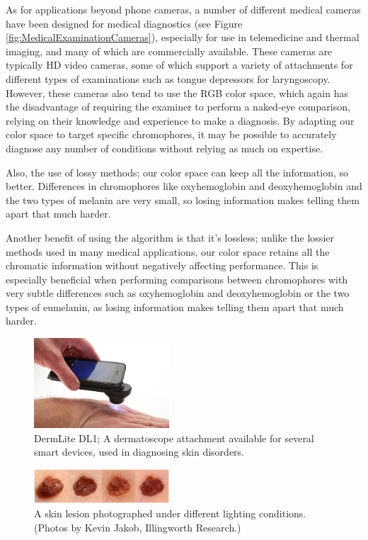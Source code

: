 As for applications beyond phone cameras, a number of different medical cameras have been designed for medical diagnostics (see Figure \ref{fig:MedicalExaminationCameras}), especially for use in telemedicine and thermal imaging, and many of which are commercially available. These cameras are typically HD video cameras, some of which support a variety of attachments for different types of examinations such as tongue depressors for laryngoscopy. However, these cameras also tend to use the RGB color space, which again has the disadvantage of requiring the examiner to perform a naked-eye comparison, relying on their knowledge and experience to make a diagnosis. By adapting our color space to target specific chromophores, it may be possible to accurately diagnose any number of conditions without relying as much on expertise. 

Also, the use of lossy methods; our color space can keep all the information, so better. Differences in chromophores like oxyhemoglobin and deoxyhemoglobin and the two types of melanin are very small, so losing information makes telling them apart that much harder.

Another benefit of using the algorithm is that it's lossless; unlike the lossier methods used in many medical applications, our color space retains all the chromatic information without negatively affecting performance. This is especially beneficial when performing comparisons between chromophores with very subtle differences such as oxyhemoglobin and deoxyhemoglobin or the two types of eumelanin, as losing information makes telling them apart that much harder.

\begin{figure}[h!]
  \centering
    \includegraphics[width=0.45\textwidth]{Chapter5/Figs/DermLite-DL1.jpg}
    \caption{DermLite DL1; A dermatoscope attachment available for several smart devices, used in diagnosing skin disorders.}\label{fig:DermatoscopePhone}
\end{figure}

\begin{figure}[h!]
  \centering
    \includegraphics[width=0.45\textwidth]{Chapter5/Figs/melanoma-images.jpg}
    \caption{A skin lesion photographed under different lighting conditions. (Photos by Kevin Jakob, Illingworth Research.)}\label{fig:MelanomaImages}
\end{figure}

